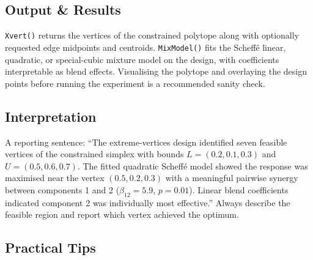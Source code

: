 \documentclass[
]{article}
\begin{document}
\subsection{Output \& Results}\label{output-results}

\texttt{Xvert()} returns the vertices of the constrained polytope along
with optionally requested edge midpoints and centroids.
\texttt{MixModel()} fits the Scheffé linear, quadratic, or special-cubic
mixture model on the design, with coefficients interpretable as blend
effects. Visualising the polytope and overlaying the design points
before running the experiment is a recommended sanity check.

\subsection{Interpretation}\label{interpretation}

A reporting sentence: ``The extreme-vertices design identified seven
feasible vertices of the constrained simplex with bounds
\(L = (0.2, 0.1, 0.3)\) and \(U = (0.5, 0.6, 0.7)\). The fitted
quadratic Scheffé model showed the response was maximised near the
vertex \((0.5, 0.2, 0.3)\) with a meaningful pairwise synergy between
components 1 and 2 (\(\beta_{12} = 5.9\), \(p = 0.01\)). Linear blend
coefficients indicated component 2 was individually most effective.''
Always describe the feasible region and report which vertex achieved the
optimum.

\subsection{Practical Tips}\label{practical-tips}
\end{document}

